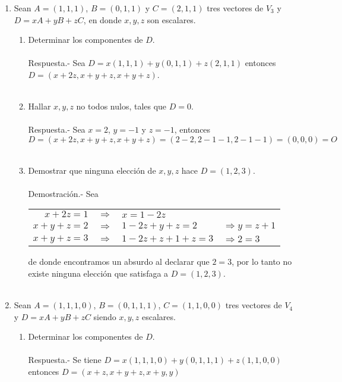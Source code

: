 \begin{enumerate}
\begin{enumerate}[\bfseries a)]
\end{enumerate}

\item Sean $A=(1,1,1)$, $B=(0,1,1)$ y $C=(2,1,1)$ tres vectores de $V_3$ y $D=xA+yB+zC$, en donde $x,y,z$ son escalares.
\begin{enumerate}[\bfseries a)]

    \item Determinar los componentes de $D$.\\\\
	Respuesta.-\; Sea $D=x(1,1,1)+y(0,1,1)+z(2,1,1)$ entonces $D=(x+2z,x+y+z,x+y+z)$.\\\\


    \item Hallar $x,y,z$ no todos nulos, tales que $D=0$.\\\\
	Respuesta.-\; Sea $x=2$, $y=-1$ y $z=-1$, entonces $$D=(x+2z,x+y+z,x+y+z)=(2-2,2-1-1,2-1-1)=(0,0,0)=O$$ \\

    \item Demostrar que ninguna elección de $x,y,z$ hace $D=(1,2,3)$.\\\\
	Demostración.-\; Sea 
	\begin{center}
	    \begin{tabular}{rcll}
		$x+2z=1$&$\Longrightarrow$&$x=1-2z$&\\
		$x+y+z=2$&$\Longrightarrow$&$1-2z+y+z=2$&$\Longrightarrow y=z+1$\\
		$x+y+z=3$&$\Longrightarrow$&$1-2z+z+1+z=3$&$\Longrightarrow 2=3$\\
	    \end{tabular}
	\end{center}
	de donde encontramos un absurdo al declarar que $2=3$, por lo tanto no existe ninguna elección que satisfaga a $D=(1,2,3)$.\\\\

\end{enumerate}

\item Sean $A=(1,1,1,0)$, $B=(0,1,1,1)$, $C=(1,1,0,0)$ tres vectores de $V_4$ y $D=xA+yB+zC$ siendo $x,y,z$ escalares.
\begin{enumerate}[\bfseries a)]

    \item Determinar los componentes de $D$.\\\\
	Respuesta.-\; Se tiene $D=x(1,1,1,0)+y(0,1,1,1)+z(1,1,0,0)$ entonces $D=(x+z,x+y+z,x+y,y)$\\\\


\end{enumerate}
\end{enumerate}
